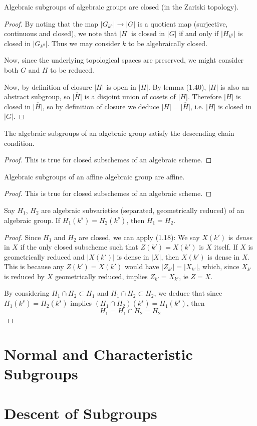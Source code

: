 \documentclass{memoir}
\begin{document}
\begin{proposition}[1.41]
	Algebraic subgroups of algebraic groups are closed
	(in the Zariski topology).
\end{proposition}

\begin{proof}
	By noting that the map $|G_{k^a}|\to |G|$ is a quotient map (surjective,
	continuous and closed), we note that $|H|$ is closed in $|G|$ if and
	only if $|H_{k^a}|$ is closed in $|G_{k^a}|$. Thus we may consider
	$k$ to be algebraically closed.
	
	Now, since the underlying topological spaces are preserved, we might
	consider both $G$ and $H$ to be reduced.
	
	Now, by definition of closure $|H|$ is open in
	$\overline{|H|}$. By lemma (1.40), $\overline{|H|}$ is also an
	abstract subgroup, so $\overline{|H|}$ is a disjoint union of cosets
	of $|H|$. Therefore $|H|$ is closed in $\overline{|H|}$, so by definition
	of closure we deduce $|H|=\overline{|H|}$, i.e. $|H|$ is closed in $|G|$.
\end{proof}

\begin{corollary}[1.42]
	The algebraic subgroups of an algebraic group satisfy the descending
	chain condition.
\end{corollary}
\begin{proof}
	This is true for closed subschemes of an algebraic scheme.
\end{proof}

\begin{corollary}[1.43]
	Algebraic subgroups of an affine algebraic group are affine.
\end{corollary}
\begin{proof}
	This is true for closed subschemes of an algebraic scheme.
\end{proof}

\begin{corollary}
	Say $H_1$, $H_2$ are algebraic subvarieties (separated, geometrically
	reduced) of an algebraic group. If $H_1(k^s)=H_2(k^s)$, then $H_1=H_2$.
\end{corollary}

\begin{proof}
	Since $H_1$ and $H_2$ are closed, we can apply (1.18):
	We say
	$X(k')$ is \emph{dense} in $X$ if the only closed subscheme such that
	$Z(k')=X(k')$ is $X$ itself. If $X$ is geometrically reduced and
	$|X(k')|$ is dense in $|X|$, then $X(k')$ is dense in $X$. This is
	because any $Z(k') = X(k')$ would have $|Z_{k'}|=|X_{k'}|$, which,
	since $X_{k'}$ is reduced by $X$ geometrically reduced, implies
	$Z_{k'}=X_{k'}$, ie $Z = X$.
	
	By considering $H_1\cap H_2 \subset H_1$ and $H_1\cap H_2 \subset H_2$,
	we deduce that since $H_1(k^s)=H_2(k^s)$ implies
	$(H_1\cap H_2)(k^s)=H_1(k^s)$, then
	$$H_1 = H_1 \cap H_2 = H_2$$
\end{proof}

\section{Normal and Characteristic Subgroups}

\section{Descent of Subgroups}
\end{document}
